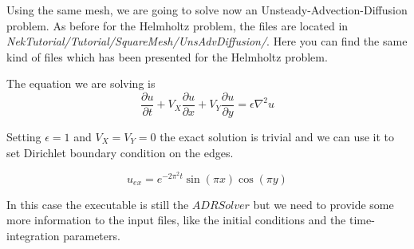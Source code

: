 \documentclass[12pt]{article}
\begin{document}
Using the same mesh, we are going to solve now an Unsteady-Advection-Diffusion problem. As before for the Helmholtz problem, the files are located in
\emph{NekTutorial/Tutorial/SquareMesh/UnsAdvDiffusion/}. Here you can find the same kind of files which has been presented for the Helmholtz problem.

The equation we are solving is
\begin{equation}
\frac{\partial u}{\partial t} + V_X \frac{\partial u}{\partial x} + V_Y \frac{\partial u}{\partial y} = \epsilon \nabla^2 u
\end{equation}

\noindent
Setting $\epsilon = 1$ and $V_X=V_Y=0$ the exact solution is trivial and we can use it to set Dirichlet boundary condition on the edges.

\begin{equation}
u_{ex}= e^{-2\pi^2 t}\sin(\pi x)\cos(\pi y)
\end{equation}

\noindent
In this case the executable is still the $ADRSolver$ but we need to provide some more information to the input files, like the initial conditions and the time-integration parameters.
\end{document}
